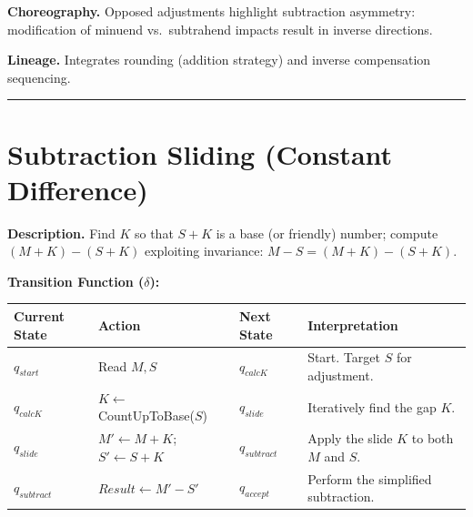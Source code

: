 \documentclass[12pt]{book}
\begin{document}
\textbf{Choreography.} Opposed adjustments highlight subtraction
asymmetry: modification of minuend vs.~subtrahend impacts result in
inverse directions.

\textbf{Lineage.} Integrates rounding (addition strategy) and inverse
compensation sequencing.

\begin{center}\rule{0.5\linewidth}{0.5pt}\end{center}

\section{Subtraction Sliding (Constant
Difference)}\label{subtraction-sliding-constant-difference}

\textbf{Description.} Find \(K\) so that \(S + K\) is a base (or
friendly) number; compute \((M + K) - (S + K)\) exploiting invariance:
\(M - S = (M+K) - (S+K)\).

\textbf{Transition Function (\(\delta\)):}

\begin{longtable}[]{@{}
  >{\raggedright\arraybackslash}p{}
  >{\raggedright\arraybackslash}p{}
  >{\raggedright\arraybackslash}p{}
  >{\raggedright\arraybackslash}p{}@{}}
\toprule\noalign{}
\begin{minipage}[b]{\linewidth}\raggedright
Current State
\end{minipage} & \begin{minipage}[b]{\linewidth}\raggedright
Action
\end{minipage} & \begin{minipage}[b]{\linewidth}\raggedright
Next State
\end{minipage} & \begin{minipage}[b]{\linewidth}\raggedright
Interpretation
\end{minipage} \\
\midrule\noalign{}
\endhead
\bottomrule\noalign{}
\endlastfoot
\(q_{start}\) & Read \(M, S\) & \(q_{calcK}\) & Start. Target \(S\) for
adjustment. \\
\(q_{calcK}\) & \(K \leftarrow\) CountUpToBase(\(S\)) & \(q_{slide}\) &
Iteratively find the gap \(K\). \\
\(q_{slide}\) & \(M' \leftarrow M+K\); \(S' \leftarrow S+K\) &
\(q_{subtract}\) & Apply the slide \(K\) to both \(M\) and \(S\). \\
\(q_{subtract}\) & \(Result \leftarrow M' - S'\) & \(q_{accept}\) &
Perform the simplified subtraction. \\
\end{longtable}
\end{document}

